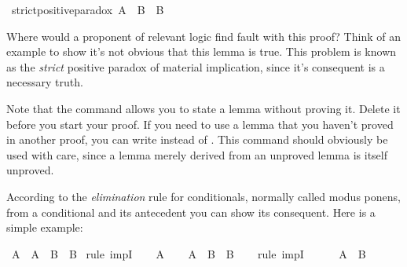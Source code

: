 \begin{isabellebody}
\isamarkupfalse%
\ strict{\isacharunderscore}positive{\isacharunderscore}paradox{\isacharcolon}\ {\isachardoublequoteopen}A\ {\isasymlongrightarrow}\ B\ {\isasymlongrightarrow}\ B{\isachardoublequoteclose}%
\isadelimproof
\ %
\endisadelimproof
%
\isatagproof
{}\isamarkupfalse%
%
\endisatagproof
{\isafoldproof}%
%
\isadelimproof
%
\endisadelimproof
%
\begin{isamarkuptext}%
Where would a proponent of relevant logic find fault with this proof? Think of an example
to show it's not obvious that this lemma is true. This problem is known as the \emph{strict} positive
paradox of material implication, since it's consequent  is a necessary truth.%
\end{isamarkuptext}\isamarkuptrue%
%
\begin{isamarkuptext}%
Note that the command  allows you to state a lemma without proving it. Delete 
it before you start your proof. If you need to use a lemma that you haven't proved in another proof, you can
write  instead of . This command should obviously be used with care,
since a lemma merely derived from an unproved lemma is itself unproved.%
\end{isamarkuptext}\isamarkuptrue%
%
\isamarkuptrue%
%
\begin{isamarkuptext}%
According to the \emph{elimination} rule for conditionals, normally called modus ponens,
from a conditional and its antecedent you can show its consequent. Here is a simple example:%
\end{isamarkuptext}\isamarkuptrue%
\isamarkupfalse%
\ {\isachardoublequoteopen}A\ {\isasymlongrightarrow}\ {\isacharparenleft}A\ {\isasymlongrightarrow}\ B{\isacharparenright}\ {\isasymlongrightarrow}\ B{\isachardoublequoteclose}\isanewline
%
\isadelimproof
%
\endisadelimproof
%
\isatagproof
{}\isamarkupfalse%
\ {\isacharparenleft}rule\ impI{\isacharparenright}\isanewline
\ \ \isamarkupfalse%
\ {\isachardoublequoteopen}A{\isachardoublequoteclose}\isanewline
\ \ \isamarkupfalse%
\ {\isachardoublequoteopen}{\isacharparenleft}A\ {\isasymlongrightarrow}\ B{\isacharparenright}\ {\isasymlongrightarrow}\ B{\isachardoublequoteclose}\isanewline
\ \ \isamarkupfalse%
\ {\isacharparenleft}rule\ impI{\isacharparenright}\isanewline
\ \ \ \ \isamarkupfalse%
\ {\isachardoublequoteopen}A\ {\isasymlongrightarrow}\ B{\isachardoublequoteclose}\isanewline

\end{isabellebody}
